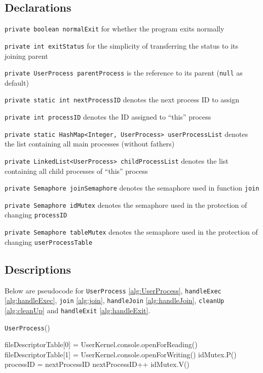\documentclass{article}
\begin{document}
\begin{spacing}{1.1}
\subsection{Declarations}
\texttt{private boolean normalExit} for whether the program exits normally

\texttt{private int exitStatus} for the simplicity of transferring the status to its joining parent

\texttt{private UserProcess parentProcess} is the reference to its parent (\texttt{null} as default)

\texttt{private static int nextProcessID} denotes the next process ID to assign

\texttt{private int processID} denotes the ID assigned to ``this'' process

\texttt{private static HashMap<Integer, UserProcess> userProcessList} denotes the list containing all main processes (without fathers)

\texttt{private LinkedList<UserProcess> childProcessList} denotes the list containing all child processes of ``this'' process

\texttt{private Semaphore joinSemaphore} denotes the semaphore used in function \texttt{join}

\texttt{private Semaphore idMutex} denotes the semaphore used in the protection of changing \texttt{processID}

\texttt{private Semaphore tableMutex} denotes the semaphore used in the protection of changing \linebreak \texttt{userProcessTable}
\subsection{Descriptions}
Below are pseudocode for \texttt{UserProcess} \ref{alg:UserProcess}, \texttt{handleExec} \ref{alg:handleExec}, \texttt{join} \ref{alg:join}, \texttt{handleJoin} \ref{alg:handleJoin}, \texttt{cleanUp} \ref{alg:cleanUp} and \texttt{handleExit} \ref{alg:handleExit}.
\begin{algorithm}[htbp]
  \label{alg:UserProcess}
\caption{\texttt{UserProcess}()}
  \begin{algorithmic}[1]
    \STATE fileDescriptorTable[0] = UserKernel.console.openForReading()
    \STATE fileDescriptorTable[1] = UserKernel.console.openForWriting()
    \STATE \colorbox{myyellow}{idMutex.P()}
	\STATE processID = nextProcessID
	\STATE nextProcessID++
	\STATE \colorbox{myyellow}{idMutex.V()}
  \end{algorithmic}
\end{algorithm}


\end{spacing}
\end{document}
